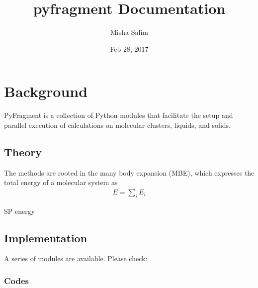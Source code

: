 \documentclass[letterpaper,10pt,english]{sphinxmanual}
\title{pyfragment Documentation}
\date{Feb 28, 2017}
\author{Misha Salim}
\begin{document}
\maketitle
\sphinxtableofcontents
{}\label{\detokenize{index::doc}}



\chapter{Background}
\label{\detokenize{background::doc}}\label{\detokenize{background:pyfragment-documentation}}\label{\detokenize{background:background}}
PyFragment is a collection of Python modules that facilitate the setup and
parallel execution of  calculations on molecular clusters,
liquids, and solids.


\section{Theory}
\label{\detokenize{background:theory}}
The  methods are rooted in the many body expansion (MBE),
which expresses the total energy of a molecular system as
\begin{equation*}
\begin{split}E = \sum_{i} E_{i}\end{split}
\end{equation*}

\begin{fulllineitems}
\label{\detokenize{background:drivers.energy_driver}}
SP energy

\end{fulllineitems}



\section{Implementation}
\label{\detokenize{background:implementation}}
A series of modules are available. Please check:


\subsection{Codes}
\label{\detokenize{background:module-ChargeState}}\label{\detokenize{background:codes}}
\end{document}
